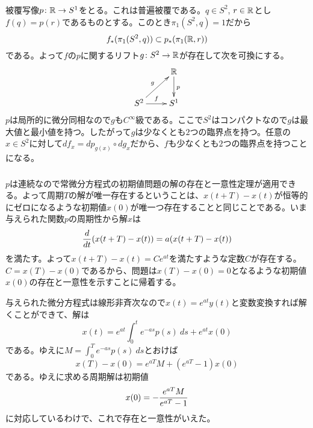 \newpage


\subsubsection{}%
\begin{sol}
  被覆写像$p \colon {\mathbb R} \to S^1$をとる。これは普遍被覆である。$q \in S^2$, $r \in {\mathbb R}$とし$f(q ) = p(r)$であるものとする。このとき$\pi_1(S^2, q) = 1$だから
  \[
  f_*( \pi_1(S^2, q) ) \subset p_*( \pi_1({\mathbb R},r))
  \]
  である。よって$f$の$p$に関するリフト$g \colon S^2 \to {\mathbb R}$が存在して次を可換にする。
  \[
  \xymatrix{
  {} & \R \ar[d]^p \\
  S^2 \ar[ru]^g  \ar[r]^f & S^1
  }
  \]
  $p$は局所的に微分同相なので$g$も$C^{\infty}$級である。ここで$S^2$はコンパクトなので$g$は最大値と最小値を持つ。したがって$g$は少なくとも$2$つの臨界点を持つ。任意の$x \in S^2$に対して$df_x = dp_{g(x)} \circ dg_x$だから、$f$も少なくとも$2$つの臨界点を持つことになる。
\end{sol}

\newpage

\subsubsection{}%
\begin{sol}
  $p$は連続なので常微分方程式の初期値問題の解の存在と一意性定理が適用できる。よって周期$T$の解が唯一存在するということは、$x(t+T) - x(t)$が恒等的にゼロになるような初期値$x(0)$が唯一つ存在することと同じことである。いま与えられた関数$p$の周期性から解$x$は
  \[
  \frac{d}{dt} ( x(t+T) - x(t) ) = a( x(t+T) - x(t))
  \]
を満たす。よって$ x(t+T) - x(t) = Ce^{at}$を満たすような定数$C$が存在する。$C = x(T)-x(0)$であるから、問題は$x(T)-x(0)=0$となるような初期値$x(0)$の存在と一意性を示すことに帰着する。

与えられた微分方程式は線形非斉次なので$x(t)=e^{at} y(t)$と変数変換すれば解くことができて、解は
\[
x(t) = e^{at} \int_0^t e^{-as} p(s) \ ds + e^{at} x(0)
\]
である。ゆえに$M =  \int_0^T e^{-as} p(s) \ ds$とおけば
\[
x(T) - x(0) = e^{aT} M + (e^{aT} - 1)x(0)
\]
である。ゆえに求める周期解は初期値
\[
x(0) = - \frac{ e^{aT} M }{ e^{aT} - 1}
\]
に対応しているわけで、これで存在と一意性がいえた。
\end{sol}


